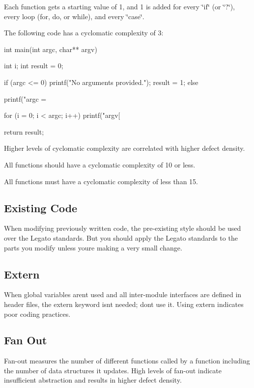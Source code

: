 Each function gets a starting value of 1, and 1 is added for every \char`\"{}if\char`\"{} (or \char`\"{}?\char`\"{}), every loop (for, do, or while), and every \char`\"{}case\char`\"{}.

The following code has a cyclomatic complexity of 3\+:

\begin{DoxyVerb}int main(int argc, char** argv)
{
    int i;
    int result = 0;

    if (argc <= 0)
    {
        printf("No arguments provided.\n");
        result = 1;
    }
    else
    {
        printf("argc = %

        for (i = 0; i < argc; i++)
        {
            printf("argv[%
        }
    }
    return result;
}
\end{DoxyVerb}


Higher levels of cyclomatic complexity are correlated with higher defect density.

All functions should have a cyclomatic complexity of 10 or less.

All functions must have a cyclomatic complexity of less than 15.\hypertarget{ccoding_stds_main_cstdsExistingCode}{}\subsection{Existing Code}\label{ccoding_stds_main_cstdsExistingCode}
When modifying previously written code, the pre-\/existing style should be used over the Legato standards. But you should apply the Legato standards to the parts you modify unless you\textquotesingle{}re making a very small change.\hypertarget{ccoding_stds_main_cstdsExtern}{}\subsection{Extern}\label{ccoding_stds_main_cstdsExtern}
When global variables aren\textquotesingle{}t used and all inter-\/module interfaces are defined in header files, the extern keyword isn\textquotesingle{}t needed; don\textquotesingle{}t use it. Using extern indicates poor coding practices.\hypertarget{ccoding_stds_main_cstdsFanOut}{}\subsection{Fan Out}\label{ccoding_stds_main_cstdsFanOut}
Fan-\/out measures the number of different functions called by a function including the number of data structures it updates. High levels of fan-\/out indicate insufficient abstraction and results in higher defect density.

